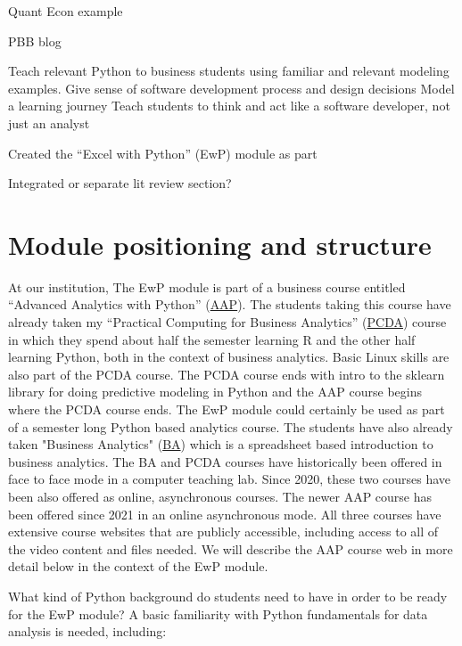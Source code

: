 \documentclass[ited,blindrev]{informs3}              %
\begin{document}
Quant Econ example

PBB blog


Teach relevant Python to business students using familiar and relevant modeling examples.
Give sense of software development process and design decisions
Model a learning journey
Teach students to think and act like a software developer, not just an analyst

Created the ``Excel with Python'' (EwP) module as part

Integrated or separate lit review section?

\section{Module positioning and structure}


At our institution, The EwP module is part of a business course entitled ``Advanced Analytics with Python'' (\href{http://www.sba.oakland.edu/faculty/isken/courses/mis6900}{AAP}). The students taking this course have already taken my ``Practical Computing for Business Analytics'' (\href{http://www.sba.oakland.edu/faculty/isken/courses/mis5470}{PCDA}) course in which they spend about half the semester learning R and the other half learning Python, both in the context of business analytics. Basic Linux skills are also part of the PCDA course. The PCDA course ends with intro to the sklearn library for doing predictive modeling in Python and the AAP course begins where the PCDA course ends.  The EwP module could certainly be used as part of a semester long Python based analytics course. The students have also already taken "Business Analytics" (\href{http://www.sba.oakland.edu/faculty/isken/courses/mis5460}{BA}) which is a spreadsheet based introduction to business analytics. The BA and PCDA courses have historically been offered in face to face mode in a computer teaching lab. Since 2020, these two courses have been also offered as online, asynchronous courses. The newer AAP course has been offered since 2021 in an online asynchronous mode. All three courses have extensive course websites that are publicly accessible, including access to all of the video content and files needed. We will describe the AAP course web in more detail below in the context of the EwP module.

What kind of Python background do students need to have in order to be ready for the EwP module? A basic familiarity with Python fundamentals for data analysis is needed, including:
\end{document}

